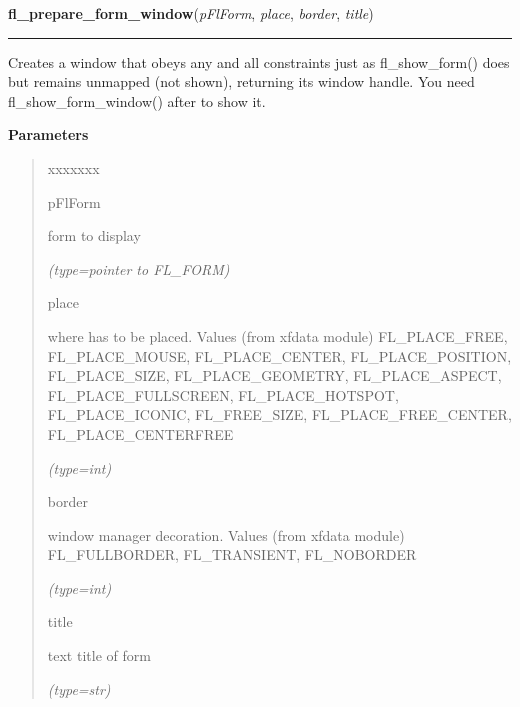     \vspace{0.5ex}

\hspace{.8\funcindent}\begin{boxedminipage}{\funcwidth}

    \raggedright \textbf{fl\_prepare\_form\_window}(\textit{pFlForm}, \textit{place}, \textit{border}, \textit{title})

    \vspace{-1.5ex}

    \rule{\textwidth}{0.5\fboxrule}
\setlength{\parskip}{2ex}
    Creates a window that obeys any and all constraints just as 
    fl\_show\_form() does but remains unmapped (not shown), returning its 
    window handle. You need fl\_show\_form\_window() after to show it.

\setlength{\parskip}{1ex}
      \textbf{Parameters}
      \vspace{-1ex}

      \begin{quote}
        \begin{Ventry}{xxxxxxx}

          \item[pFlForm]

          form to display

            {\it (type=pointer to FL\_FORM)}

          \item[place]

          where has to be placed. Values (from xfdata module) 
          FL\_PLACE\_FREE, FL\_PLACE\_MOUSE, FL\_PLACE\_CENTER, 
          FL\_PLACE\_POSITION, FL\_PLACE\_SIZE, FL\_PLACE\_GEOMETRY, 
          FL\_PLACE\_ASPECT, FL\_PLACE\_FULLSCREEN, FL\_PLACE\_HOTSPOT, 
          FL\_PLACE\_ICONIC, FL\_FREE\_SIZE, FL\_PLACE\_FREE\_CENTER, 
          FL\_PLACE\_CENTERFREE

            {\it (type=int)}

          \item[border]

          window manager decoration. Values (from xfdata module) 
          FL\_FULLBORDER, FL\_TRANSIENT, FL\_NOBORDER

            {\it (type=int)}

          \item[title]

          text title of form

            {\it (type=str)}


\end{Ventry}
\end{quote}
\end{boxedminipage}
